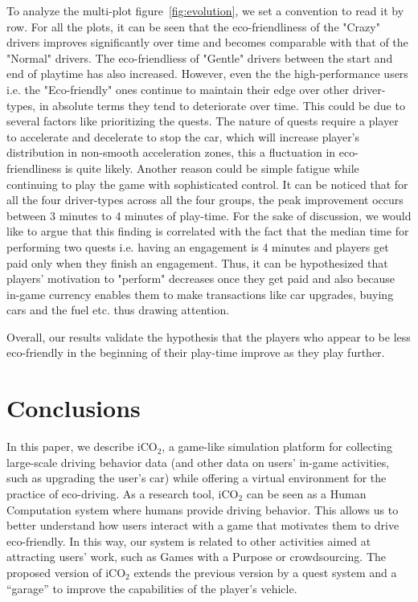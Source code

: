 \documentclass[preprint,authoryear,12pt]{elsarticle}
\begin{document}
To analyze the multi-plot figure~\ref{fig:evolution}, we set a convention to read it by row. For all the plots, it can be seen that the eco-friendliness of the "Crazy" drivers improves significantly over time and becomes comparable with that of the "Normal" drivers. The eco-friendliess of "Gentle" drivers between the start and end of playtime has also increased. However, even the  the high-performance users i.e. the "Eco-friendly" ones continue to maintain their edge over other driver-types, in absolute terms they tend to deteriorate over time. This could be due to several factors like prioritizing the quests. The nature of quests require a player to accelerate and decelerate to stop the car, which will increase player's distribution in non-smooth acceleration zones, this a fluctuation in eco-friendliness is quite likely. Another reason could be simple fatigue while continuing to play the game with sophisticated control. It can be noticed that for all the four driver-types across all the four groups, the peak improvement occurs between 3 minutes to 4 minutes of play-time. For the sake of discussion, we would like to argue that this finding is correlated with the fact that the median time for performing two quests i.e. having an engagement is 4 minutes and players get paid only when they finish an engagement. Thus, it can be hypothesized that players' motivation to "perform" decreases once they get paid and also because in-game currency  enables them to make transactions like car upgrades, buying cars and the fuel etc. thus drawing attention.

Overall, our results validate the hypothesis that the players who appear to be less eco-friendly in the beginning of their play-time improve as they play further.



\section{Conclusions} \label{sec:conclusions}

In this paper, we describe iCO$_2$, a game-like simulation platform for collecting large-scale driving behavior data (and other data on users' in-game activities, such as upgrading the user's car) while offering a virtual environment for the practice of eco-driving. As a research tool, iCO$_2$ can be seen as a Human Computation system where humans provide driving behavior. This allows us to better understand how users interact with a game that motivates them to drive eco-friendly. In this way, our system is related to other activities aimed at attracting users' work, such as Games with a Purpose or crowdsourcing. The proposed version of iCO$_2$ extends the previous version \citep{prendingeroliveira2014} by a quest system and a ``garage'' to improve the capabilities of the player's vehicle.
\end{document}
